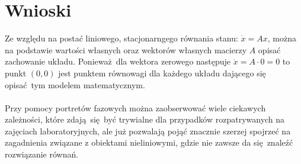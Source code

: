 \documentclass[a4paper, 12pt]{article}
\begin{document}
	\section{Wnioski}
		Ze względu na postać liniowego, stacjonarngego równania stanu: $\dot{x} = A x$, można na podstawie wartości własnych oraz wektorów własnych macierzy $A$ opisać zachowanie układu. Ponieważ dla wektora zerowego następuje $\dot{x} = A \cdot 0 = 0$ to punkt $(0, 0)$ jest punktem równowagi dla każdego układu dającego się opisać tym modelem matematycznym.
		\\ \\
		Przy pomocy portretów fazowych można zaobserwować wiele ciekawych zależności, które zdają się być trywialne dla przypadków rozpatrywanych na zajęciach laboratoryjnych, ale już pozwalają pojąć znacznie szerzej spojrzeć na zagadnienia związane z obiektami nieliniowymi, gdzie nie zawsze da się znaleźć rozwiązanie równań.
\end{document}
